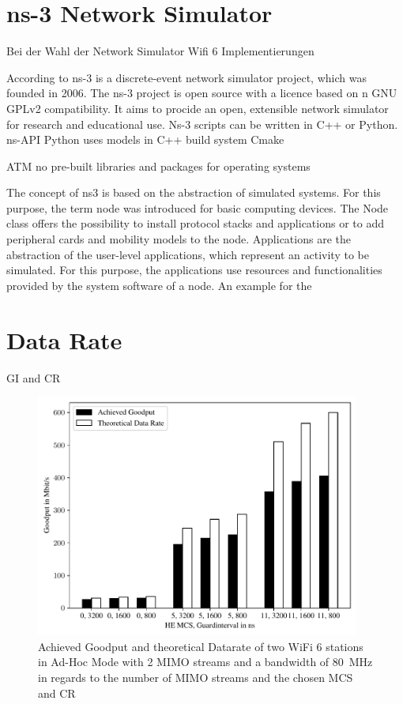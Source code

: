 \documentclass[]{nsm-thesis}
\begin{document}
 
\section{ns-3 Network Simulator}

Bei der Wahl der Network Simulator Wifi 6 Implementierungen 



According to \cite{ns3manual} ns-3 is a discrete-event network simulator project, which was founded in 2006. The ns-3 project is open source with a licence based on n GNU GPLv2 compatibility. It aims to procide an open, extensible network simulator for research and educational use. Ns-3 scripts can be written in C++ or Python.
ns-API Python uses models in C++
build system Cmake

ATM no pre-built libraries and packages for operating systems
 
The concept of ns3 is based on the abstraction of simulated systems. For this purpose, the term node was introduced for basic computing devices. The Node class offers the possibility to install protocol stacks and applications or to add peripheral cards and mobility models to the node.
Applications are the abstraction of the user-level applications, which represent an activity to be simulated. For this purpose, the applications use resources and functionalities provided by the system software of a node. An example for the 



\section{Data Rate}


\ac{GI} and \ac{CR}
\begin{figure}%
	\centering
	\includegraphics[width=0.95\textwidth]{figures/gi_dataRate_simulation.pdf}
	\caption{Achieved Goodput and theoretical Datarate of two WiFi 6 stations in Ad-Hoc Mode with \num{2} \ac{MIMO} streams and a bandwidth of \SI{80}{\mega\hertz} in regards to the number of \ac{MIMO} streams and the chosen \ac{MCS} and \ac{CR}}%
	\label{fig:Data_rate_GI}%
\end{figure}
\end{document}

